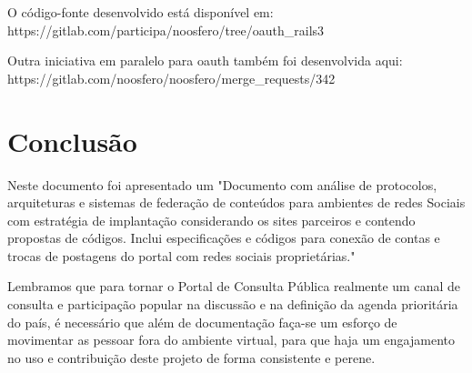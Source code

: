 \documentclass[12pt]{article}
\newcommand{\ProductDescription}{"Documento com análise de protocolos,
  arquiteturas e sistemas de federação de conteúdos para ambientes de redes
  Sociais com estratégia de implantação considerando os sites parceiros e
  contendo propostas de códigos. Inclui especificações e códigos para conexão
  de contas e trocas de postagens do portal com redes sociais proprietárias."
}
\begin{document}
O código-fonte desenvolvido está disponível em:
https://gitlab.com/participa/noosfero/tree/oauth\_rails3

Outra iniciativa em paralelo para oauth também foi desenvolvida aqui:
https://gitlab.com/noosfero/noosfero/merge\_requests/342

\section{Conclusão}

Neste documento foi apresentado um \ProductDescription

%
%

Lembramos que para tornar o Portal de Consulta Pública realmente um canal de
consulta e participação popular na discussão e na definição da agenda
prioritária do país, é necessário que além de documentação faça-se um esforço
de movimentar as pessoar fora do ambiente virtual, para que haja um
engajamento no uso e contribuição deste projeto de forma consistente e perene.

\newpage

\newpage
\listoffigures
\newpage
\printindex
%
%
\end{document}
